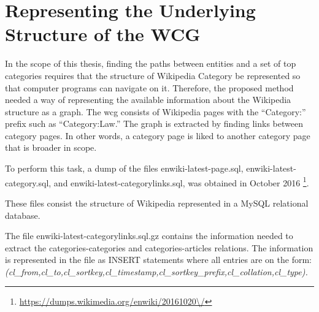 
\chapter{Representing the Underlying Structure of the WCG}
\label{app:representing-structre}

In the scope of this thesis, finding the paths between entities and a set of top categories requires that the structure of Wikipedia Category be represented so that computer programs can navigate on it. 
Therefore, the proposed method needed a way of representing the available information about the Wikipedia structure as a graph. The \gls{wcg} consists of Wikipedia pages with the “Category:” prefix such as “Category:Law.” The graph is extracted by finding links between category pages. In other words, a category page is liked to another category page that is broader in scope.

To perform this task, a dump of the files enwiki-latest-page.sql, enwiki-latest-category.sql, and enwiki-latest-categorylinks.sql, was obtained in October 2016 \footnote{\url{https://dumps.wikimedia.org/enwiki/20161020\/}}.

These files consist the structure of Wikipedia represented in a MySQL relational database.

The file enwiki-latest-categorylinks.sql.gz contains the information needed to extract the categories-categories and categories-articles relations. The information is represented in the file as INSERT statements where all entries are on the form: \\
\textit{
(cl\_from,cl\_to,cl\_sortkey,cl\_timestamp,cl\_sortkey\_prefix,cl\_collation,cl\_type). }



